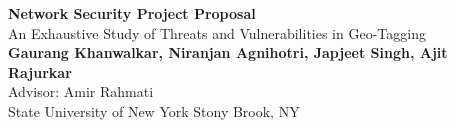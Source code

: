 \documentclass[12pt]{extarticle}
\begin{document}
	\begin{center}


		\LARGE{\textbf{Network Security Project Proposal}} \\
        \vspace{1em}
        \Large{An Exhaustive Study of Threats and Vulnerabilities in Geo-Tagging} \\
        \vspace{1em}
        \normalsize\textbf{Gaurang Khanwalkar, Niranjan Agnihotri, Japjeet Singh, Ajit Rajurkar} \\
        \vspace{1em}
        \normalsize{Advisor: Amir Rahmati} \\
        \vspace{1em}
        \normalsize{State University of New York Stony Brook, NY} \\

	\end{center}
\end{document}
